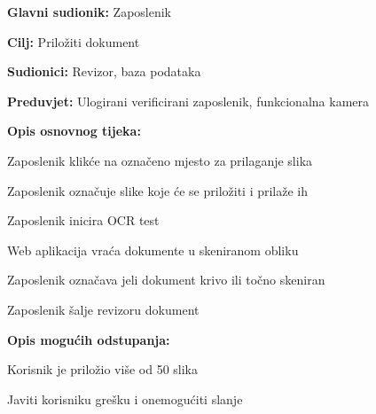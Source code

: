 					\noindent {}
					\begin{packed_item}
	
						\item \textbf{Glavni sudionik:} Zaposlenik
						\item  \textbf{Cilj:} Priložiti dokument
						\item  \textbf{Sudionici:} Revizor, baza podataka
						\item  \textbf{Preduvjet:} Ulogirani verificirani zaposlenik, funkcionalna kamera
						\item  \textbf{Opis osnovnog tijeka:}
						
						\item[] \begin{packed_enum}
	
							\item Zaposlenik klikće na označeno mjesto za prilaganje slika
							\item Zaposlenik označuje slike koje će se priložiti i prilaže ih
							\item Zaposlenik inicira OCR test
							\item Web aplikacija vraća dokumente u skeniranom obliku
							\item Zaposlenik označava jeli dokument krivo ili točno skeniran
							\item Zaposlenik šalje revizoru dokument
							
							
						\end{packed_enum}
						
						\item  \textbf{Opis mogućih odstupanja:}
						
						\item[] \begin{packed_item}
	
							\item[1.] Korisnik je priložio više od 50 slika
							\item[] \begin{packed_enum}
								
								\item Javiti korisniku grešku i onemogućiti slanje
								
							\end{packed_enum}
							
						\end{packed_item}
					\end{packed_item}
				
